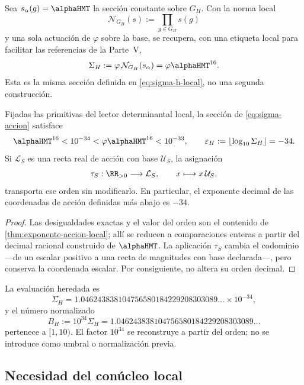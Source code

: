 Sea \(s_\alpha(g)=\alphaHMT\) la sección constante sobre \(G_H\). Con la
norma local
\[
\mathcal N_{G_H}(s):=\prod_{g\in G_H}s(g)
\]
y una sola actuación de \(\varphi\) sobre la base, se recupera, con una
etiqueta local para facilitar las referencias de la Parte~V,
\begin{equation}
\label{eq:sigma-accion}
\Sigma_H
:=\varphi\,\mathcal N_{G_H}(s_\alpha)
=\varphi\alphaHMT^{16}.
\end{equation}
Esta es la misma sección definida en \cref{eq:sigma-h-local}, no una segunda
construcción.

\begin{theorem}
\label{thm:orden-accion}
Fijadas las primitivas del lector determinantal local, la sección de
\cref{eq:sigma-accion} satisface
\[
\alphaHMT^{16}<10^{-34}
<\varphi\alphaHMT^{16}<10^{-33},
\qquad
\varepsilon_H:=\left\lfloor\log_{10}\Sigma_H\right\rfloor=-34.
\]
Si \(\mathcal L_S\) es una recta real de acción con base
\(\mathcal U_S\), la asignación
\[
\tau_S:\RR_{>0}\longrightarrow\mathcal L_S,
\qquad x\longmapsto x\,\mathcal U_S,
\]
transporta ese orden sin modificarlo. En particular, el exponente decimal
de las coordenadas de acción definidas más abajo es \(-34\).
\end{theorem}

\begin{proof}
Las desigualdades exactas y el valor del orden son el contenido de
\cref{thm:exponente-accion-local}; allí se reducen a comparaciones enteras a
partir del decimal racional construido de \(\alphaHMT\). La aplicación
\(\tau_S\) cambia el codominio —de un escalar positivo a una recta de
magnitudes con base declarada—, pero conserva la coordenada escalar. Por
consiguiente, no altera su orden decimal.
\end{proof}

La evaluación heredada es
\[
\Sigma_H
=1.046243838104756580184229208303089\ldots\times10^{-34},
\]
y el número normalizado
\[
B_H:=10^{34}\Sigma_H
=1.046243838104756580184229208303089\ldots
\]
pertenece a \([1,10)\). El factor \(10^{34}\) se reconstruye a partir del
orden; no se introduce como umbral o normalización previa.

\subsection{Necesidad del conúcleo local}

